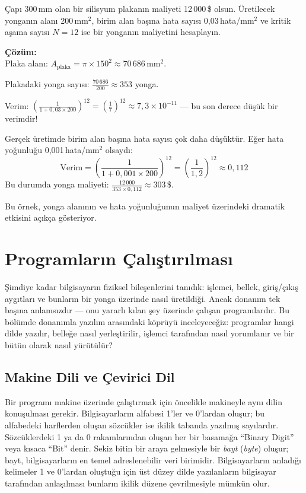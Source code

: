 \begin{ornek}[1.2]
Çapı 300\,mm olan bir silisyum plakanın maliyeti 12\,000\,\$ olsun. Üretilecek yonganın alanı 200\,mm$^2$, birim alan başına hata sayısı 0{,}03\,hata/mm$^2$ ve kritik aşama sayısı $N=12$ ise bir yonganın maliyetini hesaplayın.

\textbf{Çözüm:}\\
Plaka alanı: $A_\text{plaka} = \pi \times 150^2 \approx 70\,686$\,mm$^2$.

Plakadaki yonga sayısı: $\displaystyle\frac{70\,686}{200} \approx 353$ yonga.

Verim: $\displaystyle\left(\frac{1}{1 + 0{,}03 \times 200}\right)^{12} = \left(\frac{1}{7}\right)^{12} \approx 7{,}3 \times 10^{-11}$ --- bu son derece düşük bir verimdir!

Gerçek üretimde birim alan başına hata sayısı çok daha düşüktür. Eğer hata yoğunluğu 0{,}001\,hata/mm$^2$ olsaydı:
\[
\text{Verim} = \left(\frac{1}{1 + 0{,}001 \times 200}\right)^{12} = \left(\frac{1}{1{,}2}\right)^{12} \approx 0{,}112
\]
Bu durumda yonga maliyeti: $\displaystyle\frac{12\,000}{353 \times 0{,}112} \approx 303$\,\$.

Bu örnek, yonga alanının ve hata yoğunluğunun maliyet üzerindeki dramatik etkisini açıkça gösteriyor.
\end{ornek}


\section{Programların Çalıştırılması}
\label{sec:program-calistirma}

Şimdiye kadar bilgisayarın fiziksel bileşenlerini tanıdık: işlemci, bellek, giriş/çıkış aygıtları ve bunların bir yonga üzerinde nasıl üretildiği. Ancak donanım tek başına anlamsızdır --- onu yararlı kılan şey üzerinde çalışan programlardır. Bu bölümde donanımla yazılım arasındaki köprüyü inceleyeceğiz: programlar hangi dilde yazılır, belleğe nasıl yerleştirilir, işlemci tarafından nasıl yorumlanır ve bir bütün olarak nasıl yürütülür?

\subsection{Makine Dili ve Çevirici Dil}
\label{subsec:makine-dili-cevirici}

Bir programı makine üzerinde çalıştırmak için öncelikle makineyle aynı dilin konuşulması gerekir. Bilgisayarların alfabesi 1'ler ve 0'lardan oluşur; bu alfabedeki harflerden oluşan sözcükler ise ikilik tabanda yazılmış sayılardır. Sözcüklerdeki 1 ya da 0 rakamlarından oluşan her bir basamağa ``Binary Digit'' veya kısaca ``Bit'' denir. Sekiz bitin bir araya gelmesiyle bir \emph{bayt} (\emph{byte}) oluşur; bayt, bilgisayarların en temel adreslenebilir veri birimidir. Bilgisayarların anladığı kelimeler 1 ve 0'lardan oluştuğu için üst düzey dilde yazılanların bilgisayar tarafından anlaşılması bunların ikilik düzene çevrilmesiyle mümkün olur.

